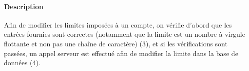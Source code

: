 \paragraph{Description} Afin de modifier les limites imposées à un compte, on vérifie d'abord que les entrées fournies sont correctes (notamment que la limite est un nombre à virgule flottante et non pas une chaîne de caractère) (3), et si les vérifications sont passées, un appel serveur est effectué afin de modifier la limite dans la base de données (4).